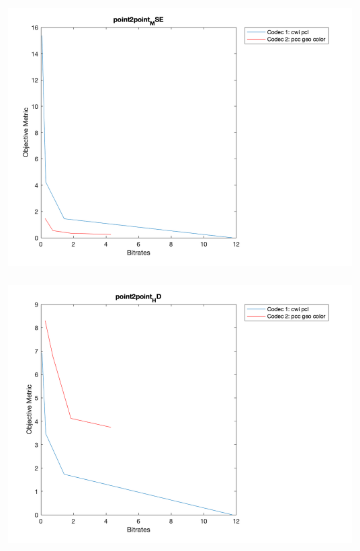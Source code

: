 \documentclass{article}
\begin{document}
\begin{figure}
    \centering
    \begin{subfigure}[b]{0.65\textwidth}
    \includegraphics[width=\textwidth]{Figures/task2/longdress_p2p_mse.png}
    \end{subfigure}

    \begin{subfigure}[b]{0.65\textwidth}
    \includegraphics[width=\textwidth]{Figures/task2/longdress_p2p_hd.png}
    \end{subfigure}


\end{figure}
\end{document}
